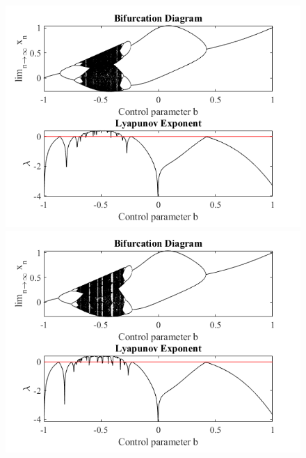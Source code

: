 \documentclass[a4paper,12pt,notitlepage]{article}
\begin{document}
\begin{figure}[h]
    \centering
        \centering
        \includegraphics[width=\textwidth]{a=5_5.png} 

        \centering
        \includegraphics[width=\textwidth]{a=6.png} 
\end{figure}
\end{document}
